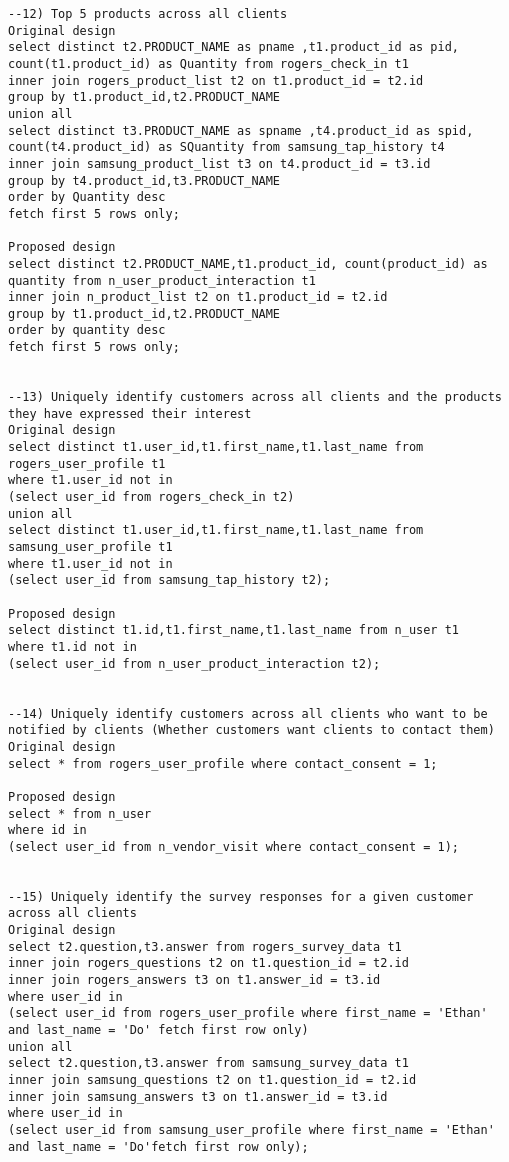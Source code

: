 \begin{lstlisting}
--12) Top 5 products across all clients
Original design
select distinct t2.PRODUCT_NAME as pname ,t1.product_id as pid, count(t1.product_id) as Quantity from rogers_check_in t1
inner join rogers_product_list t2 on t1.product_id = t2.id
group by t1.product_id,t2.PRODUCT_NAME
union all
select distinct t3.PRODUCT_NAME as spname ,t4.product_id as spid, count(t4.product_id) as SQuantity from samsung_tap_history t4
inner join samsung_product_list t3 on t4.product_id = t3.id
group by t4.product_id,t3.PRODUCT_NAME
order by Quantity desc
fetch first 5 rows only;

Proposed design
select distinct t2.PRODUCT_NAME,t1.product_id, count(product_id) as quantity from n_user_product_interaction t1
inner join n_product_list t2 on t1.product_id = t2.id
group by t1.product_id,t2.PRODUCT_NAME
order by quantity desc
fetch first 5 rows only;


--13) Uniquely identify customers across all clients and the products they have expressed their interest
Original design
select distinct t1.user_id,t1.first_name,t1.last_name from rogers_user_profile t1
where t1.user_id not in
(select user_id from rogers_check_in t2)
union all
select distinct t1.user_id,t1.first_name,t1.last_name from samsung_user_profile t1
where t1.user_id not in
(select user_id from samsung_tap_history t2);

Proposed design
select distinct t1.id,t1.first_name,t1.last_name from n_user t1
where t1.id not in
(select user_id from n_user_product_interaction t2);


--14) Uniquely identify customers across all clients who want to be notified by clients (Whether customers want clients to contact them)
Original design
select * from rogers_user_profile where contact_consent = 1;

Proposed design
select * from n_user
where id in
(select user_id from n_vendor_visit where contact_consent = 1);


--15) Uniquely identify the survey responses for a given customer across all clients
Original design
select t2.question,t3.answer from rogers_survey_data t1
inner join rogers_questions t2 on t1.question_id = t2.id
inner join rogers_answers t3 on t1.answer_id = t3.id
where user_id in
(select user_id from rogers_user_profile where first_name = 'Ethan' and last_name = 'Do' fetch first row only)
union all
select t2.question,t3.answer from samsung_survey_data t1
inner join samsung_questions t2 on t1.question_id = t2.id
inner join samsung_answers t3 on t1.answer_id = t3.id
where user_id in
(select user_id from samsung_user_profile where first_name = 'Ethan' and last_name = 'Do'fetch first row only);


\end{lstlisting}
